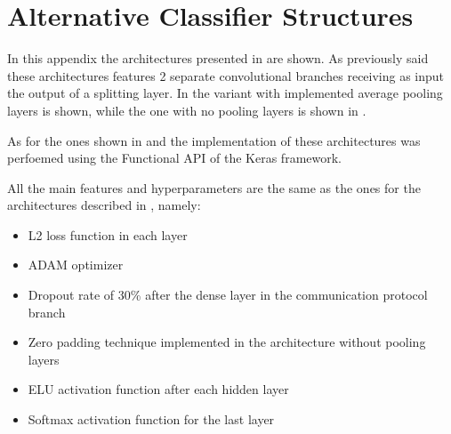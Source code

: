 \chapter{Alternative Classifier Structures} 
\label{app:2bmodel}

In this appendix the architectures presented in  are shown. As previously said these architectures features 2 separate convolutional branches receiving as input the output of a splitting layer. 
In  the variant with implemented average pooling layers is shown, while the one with no pooling layers is shown in .

As for the ones shown in  and  the implementation of these architectures was perfoemed using the Functional API of the Keras framework.

All the main features and hyperparameters are the same as the ones for the architectures described in , namely:
\begin{itemize}
    \item L2 loss function in each layer
    \item ADAM optimizer
    \item Dropout rate of 30\% after the dense layer in the communication protocol branch
    \item Zero padding technique implemented in the architecture without pooling layers
    \item ELU activation function after each hidden layer
    \item Softmax activation function for the last layer
\end{itemize}

